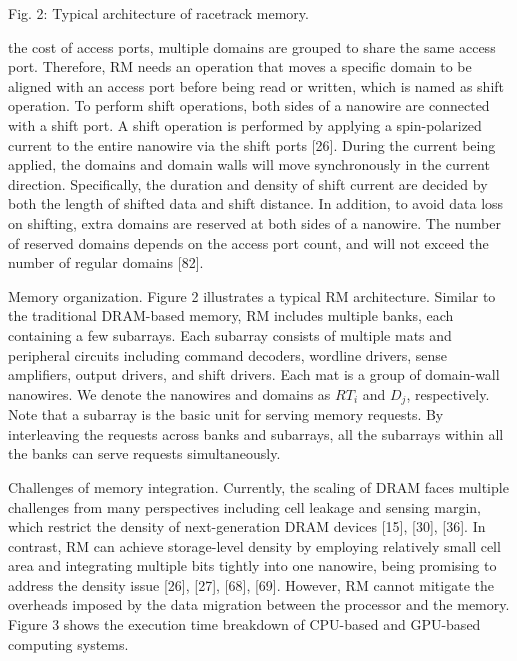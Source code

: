 \documentclass[10pt]{article}
\begin{document}
Fig. 2: Typical architecture of racetrack memory.

the cost of access ports, multiple domains are grouped to share the same access port. Therefore, RM needs an operation that moves a specific domain to be aligned with an access port before being read or written, which is named as shift operation. To perform shift operations, both sides of a nanowire are connected with a shift port. A shift operation is performed by applying a spin-polarized current to the entire nanowire via the shift ports [26]. During the current being applied, the domains and domain walls will move synchronously in the current direction. Specifically, the duration and density of shift current are decided by both the length of shifted data and shift distance. In addition, to avoid data loss on shifting, extra domains are reserved at both sides of a nanowire. The number of reserved domains depends on the access port count, and will not exceed the number of regular domains [82].

Memory organization. Figure 2 illustrates a typical RM architecture. Similar to the traditional DRAM-based memory, RM includes multiple banks, each containing a few subarrays. Each subarray consists of multiple mats and peripheral circuits including command decoders, wordline drivers, sense amplifiers, output drivers, and shift drivers. Each mat is a group of domain-wall nanowires. We denote the nanowires and domains as $R T_{i}$ and $D_{j}$, respectively. Note that a subarray is the basic unit for serving memory requests. By interleaving the requests across banks and subarrays, all the subarrays within all the banks can serve requests simultaneously.

Challenges of memory integration. Currently, the scaling of DRAM faces multiple challenges from many perspectives including cell leakage and sensing margin, which restrict the density of next-generation DRAM devices [15], [30], [36]. In contrast, RM can achieve storage-level density by employing relatively small cell area and integrating multiple bits tightly into one nanowire, being promising to address the density issue [26], [27], [68], [69]. However, RM cannot mitigate the overheads imposed by the data migration between the processor and the memory. Figure 3 shows the execution time breakdown of CPU-based and GPU-based computing systems.
\end{document}
